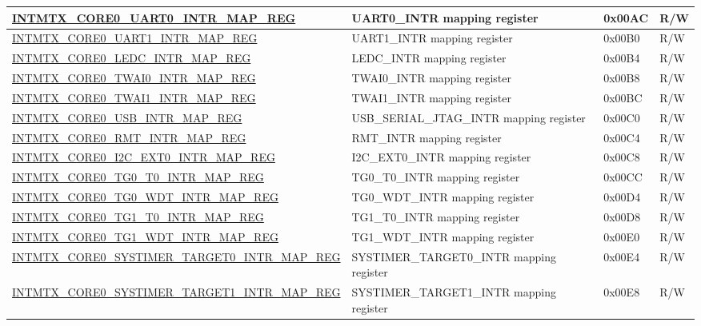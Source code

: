 \begin{longtable}{ | p{10cm} | p{10cm} | p{1.3cm} | p{1cm} | }
\hyperref[regdesc:INTMTXCORE0UART0INTRMAPREG]{INTMTX\_CORE0\_UART0\_INTR\_MAP\_REG} & UART0\_INTR mapping register & 0x00AC & R/W \\ \hline
\hyperref[regdesc:INTMTXCORE0UART1INTRMAPREG]{INTMTX\_CORE0\_UART1\_INTR\_MAP\_REG} & UART1\_INTR mapping register & 0x00B0 & R/W \\ \hline
\hyperref[regdesc:INTMTXCORE0LEDCINTRMAPREG]{INTMTX\_CORE0\_LEDC\_INTR\_MAP\_REG} & LEDC\_INTR mapping register & 0x00B4 & R/W \\ \hline
\hyperref[regdesc:INTMTXCORE0TWAI0INTRMAPREG]{INTMTX\_CORE0\_TWAI0\_INTR\_MAP\_REG} & TWAI0\_INTR mapping register & 0x00B8 & R/W \\ \hline
\hyperref[regdesc:INTMTXCORE0TWAI1INTRMAPREG]{INTMTX\_CORE0\_TWAI1\_INTR\_MAP\_REG} & TWAI1\_INTR mapping register & 0x00BC & R/W \\ \hline
\hyperref[regdesc:INTMTXCORE0USBINTRMAPREG]{INTMTX\_CORE0\_USB\_INTR\_MAP\_REG} & USB\_SERIAL\_JTAG\_INTR mapping register & 0x00C0 & R/W \\ \hline
\hyperref[regdesc:INTMTXCORE0RMTINTRMAPREG]{INTMTX\_CORE0\_RMT\_INTR\_MAP\_REG} & RMT\_INTR mapping register & 0x00C4 & R/W \\ \hline
\hyperref[regdesc:INTMTXCORE0I2CEXT0INTRMAPREG]{INTMTX\_CORE0\_I2C\_EXT0\_INTR\_MAP\_REG} & I2C\_EXT0\_INTR mapping register & 0x00C8 & R/W \\ \hline
\hyperref[regdesc:INTMTXCORE0TG0T0INTRMAPREG]{INTMTX\_CORE0\_TG0\_T0\_INTR\_MAP\_REG} & TG0\_T0\_INTR mapping register & 0x00CC & R/W \\ \hline
\hyperref[regdesc:INTMTXCORE0TG0WDTINTRMAPREG]{INTMTX\_CORE0\_TG0\_WDT\_INTR\_MAP\_REG} & TG0\_WDT\_INTR mapping register & 0x00D4 & R/W \\ \hline
\hyperref[regdesc:INTMTXCORE0TG1T0INTRMAPREG]{INTMTX\_CORE0\_TG1\_T0\_INTR\_MAP\_REG} & TG1\_T0\_INTR mapping register & 0x00D8 & R/W \\ \hline
\hyperref[regdesc:INTMTXCORE0TG1WDTINTRMAPREG]{INTMTX\_CORE0\_TG1\_WDT\_INTR\_MAP\_REG} & TG1\_WDT\_INTR mapping register & 0x00E0 & R/W \\ \hline
\hyperref[regdesc:INTMTXCORE0SYSTIMERTARGET0INTRMAPREG]{INTMTX\_CORE0\_SYSTIMER\_TARGET0\_INTR\_MAP\_REG} & SYSTIMER\_TARGET0\_INTR mapping register & 0x00E4 & R/W \\ \hline
\hyperref[regdesc:INTMTXCORE0SYSTIMERTARGET1INTRMAPREG]{INTMTX\_CORE0\_SYSTIMER\_TARGET1\_INTR\_MAP\_REG} & SYSTIMER\_TARGET1\_INTR mapping register & 0x00E8 & R/W \\ \hline

\end{longtable}
